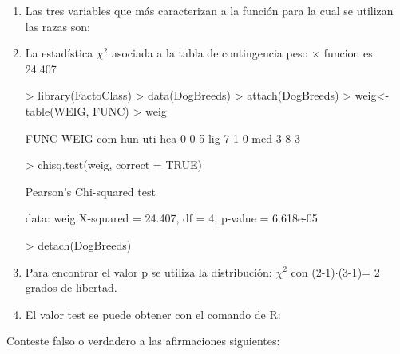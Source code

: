 \documentclass[letterpaper, 12pt]{article}
\begin{document}
\newpage 
\begin{enumerate}

\item Las tres variables que más caracterizan a la función para la cual se
utilizan las razas son: 

\item La estadística $\chi^2$ asociada a la tabla de contingencia peso × funcion
es: 24.407
\begin{Schunk}
\begin{Sinput}
> library(FactoClass)
> data(DogBreeds)
> attach(DogBreeds)
> weig<-table(WEIG, FUNC)
> weig
\end{Sinput}
\begin{Soutput}
     FUNC
WEIG  com hun uti
  hea   0   0   5
  lig   7   1   0
  med   3   8   3
\end{Soutput}
\begin{Sinput}
> chisq.test(weig, correct = TRUE)
\end{Sinput}
\begin{Soutput}
	Pearson's Chi-squared test

data:  weig
X-squared = 24.407, df = 4, p-value = 6.618e-05
\end{Soutput}
\begin{Sinput}
> detach(DogBreeds)
\end{Sinput}
\end{Schunk}
\item Para encontrar el valor p se utiliza la distribución: $\chi^2$ con (2-1)$\cdot$(3-1)= 2 grados de libertad.
\item El valor test se puede obtener con el comando de R:
\end{enumerate}
Conteste falso o verdadero a las afirmaciones siguientes:
\end{document}
